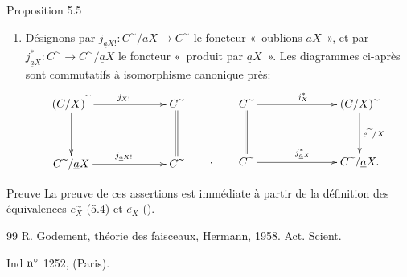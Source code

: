 \documentclass[10pt]{../fichiers-configuration-latex/smfart}
\begin{document}
\begin{enonce*}{Proposition 5.5}
\begin{enumerate}
\item Désignons par
$j_{\underline{a}X!}:C^{\sim}/\underline{a}X\rightarrow C^{\sim}$ le
foncteur « oublions $\underline{a}X$ », et par
$j^{\ast}_{\underline{a}X}:C^{\sim}\rightarrow C^{\sim}/\underline{a}X$ le
foncteur « produit par $\underline{a}X$ ». Les diagrammes ci-après
sont commutatifs à isomorphisme canonique près:
\begin{displaymath}
\xymatrix@C=2.25cm@R=1.25cm{ (C/X)^{\widetilde{\phantom{a}}}
\ar[r]^{j_{X!}} \ar[d]   &
  C\widetilde{\phantom{a}} \ar@{=}[d]\\
C\widetilde{\phantom{a}}/\underline{a}X \ar[r]^{j_{\underline{a}X!}} &
C\widetilde{\phantom{a}} } \qquad {\raisebox{-1.75cm}{,}}\qquad
\xymatrix@C=2.5cm@R=1.25cm{
C{\widetilde{\phantom{a}}} \ar[r]^{j_X^{\ast}} \ar@{=}[d]&  (C/X)\widetilde{\phantom{a}}\ar[d]^{e\widetilde{\phantom{a}}/X}\\
C{\widetilde{\phantom{a}}} \ar[r]^{j_{\underline{a}X}^{\ast}} &
C{\widetilde{\phantom{a}}}/\underline{a}X. }
\end{displaymath}
\end{enumerate}
\end{enonce*}

\begin{enonce*}[remark]{Preuve}
La preuve de ces assertions est immédiate à partir de la définition
des équivalences $e^{\sim}_X$ (\hyperref[III.prop5.4]{5.4}) et
$e^{\widehat{\phantom{\,}}}_X$ ().
\end{enonce*}

\begin{thebibliography}{99}%
 R. Godement, théorie des faisceaux, Hermann,
1958. Act. Scient.

Ind ${\rm n^{\circ}}$ 1252, (Paris).
\end{thebibliography}



\ifx\danslelivre\undefined
\end{document}
